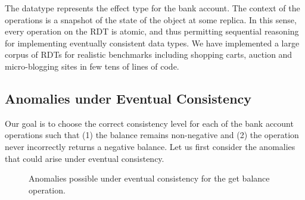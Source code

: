 The datatype  represents the effect type for the bank account. The
context of the operations is a snapshot of the state of the object at some
replica. In this sense, every operation on the RDT is atomic, and thus
permitting sequential reasoning for implementing eventually consistent data
types. We have implemented a large corpus of RDTs for realistic benchmarks
including shopping carts, auction and micro-blogging sites in few tens of lines
of code.

\subsection{Anomalies under Eventual Consistency}

Our goal is to choose the correct consistency level for each of the bank
account operations such that (1) the balance remains non-negative and (2) the
 operation never incorrectly returns a negative balance. Let us
first consider the anomalies that could arise under eventual consistency.

\begin{figure}
\centering
{}
\hfill
{}
\hfill
{}
\caption{Anomalies possible under eventual consistency for the get balance operation.}
\label{fig:ba_anomalies}
\end{figure}

